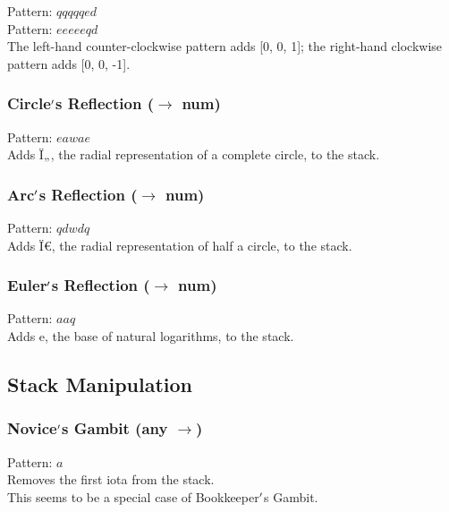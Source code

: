 \documentclass[12pt]{article}
\begin{document}
    Pattern: $qqqqqed$\\
    Pattern: $eeeeeqd$\\
      The left-hand counter-clockwise pattern adds [0, 0, 1]; the right-hand clockwise pattern adds [0, 0, -1].\\


  \label{sec: patterns/consts@hexcasting:const/double/tau}
\subsubsection*{Circle$\rq$s Reflection ($\rightarrow$ num)}

    Pattern: $eawae$\\
      Adds Ï„, the radial representation of a complete circle, to the stack.\\


  \label{sec: patterns/consts@hexcasting:const/double/pi}
\subsubsection*{Arc$\rq$s Reflection ($\rightarrow$ num)}

    Pattern: $qdwdq$\\
      Adds Ï€, the radial representation of half a circle, to the stack.\\


  \label{sec: patterns/consts@hexcasting:const/double/e}
\subsubsection*{Euler$\rq$s Reflection ($\rightarrow$ num)}

    Pattern: $aaq$\\
      Adds e, the base of natural logarithms, to the stack.\\

\newpage

\label{sec:patterns/stackmanip}
\subsection*{Stack Manipulation}


  \label{sec: patterns/stackmanip@hexcasting:pseudo-novice}
\subsubsection*{Novice$\rq$s Gambit (any $\rightarrow$)}

    Pattern: $a$\\
      Removes the first iota from the stack.\\This seems to be a special case of Bookkeeper$\rq$s Gambit.\\
\end{document}

